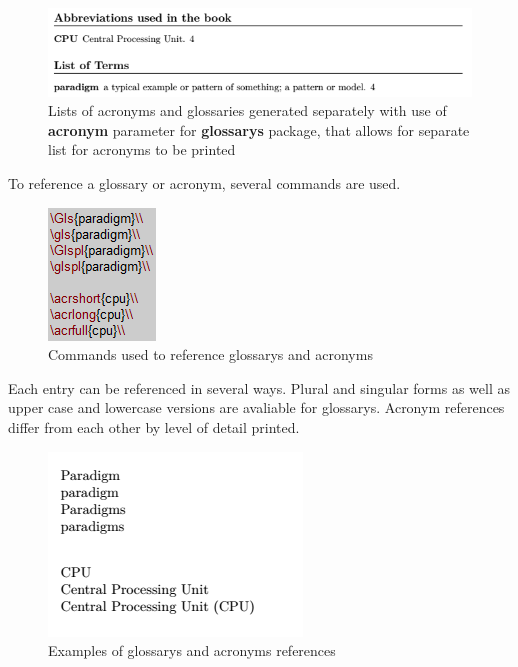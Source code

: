 \begin{figure}[H]
\centering
\includegraphics[scale=0.8]{content/LaTeX/figures/glossary_types.png}
\caption{Lists of acronyms and glossaries generated separately with use of \textbf{acronym} parameter for \textbf{\glspl{glossary}} package, that allows for separate list for acronyms to be printed}
\end{figure}

To reference a \gls{glossary} or acronym, several commands are used.

\begin{figure}[H]
\centering
\includegraphics[scale=1.0]{content/LaTeX/figures/reference_glossaries.png}
\caption{Commands used to reference \glspl{glossary} and acronyms}
\end{figure}

Each entry can be referenced in several ways. Plural and singular forms as well as upper case and lowercase versions are avaliable for \glspl{glossary}. Acronym references differ from each other by level of detail printed.

\begin{figure}[H]
\centering
\includegraphics[scale=1.0]{content/LaTeX/figures/glossary_calls.png}
\caption{Examples of \glspl{glossary} and acronyms references}
\end{figure}

